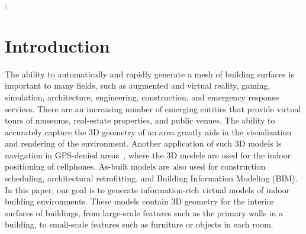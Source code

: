 \documentclass[review]{acmsiggraph}
\begin{document}
\begin{CRcatlist}
  ;
\end{CRcatlist}

\keywordlist


\TOGlinkslist


\copyrightspace

\section{Introduction}
\label{sec:introduction}

The ability to automatically and rapidly generate a mesh of building surfaces is important to many fields, such as augmented and virtual reality, gaming, simulation, architecture, engineering, construction, and emergency response services.  There are an increasing number of emerging entities that provide virtual tours of museums, real-estate properties, and public venues.  The ability to accurately capture the 3D geometry of an area greatly aids in the visualization and rendering of the environment.  Another application of such 3D models is navigation in GPS-denied areas~\cite{Liang13}, where the 3D models are used for the indoor positioning of cellphones.  As-built models are also used for construction scheduling, architectural retrofitting, and Building Information Modeling (BIM).  In this paper, our goal is to generate information-rich virtual models of indoor building environments.  These models contain 3D geometry for the interior surfaces of buildings, from large-scale features such as the primary walls in a building, to small-scale features such as furniture or objects in each room.
\end{document}
